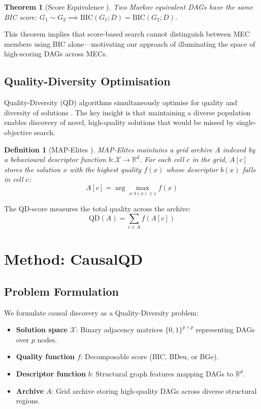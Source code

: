 \documentclass[11pt,a4paper]{article}
\newtheorem{theorem}{Theorem}
\newtheorem{definition}{Definition}
\begin{document}
\begin{theorem}[Score Equivalence {\citep{chickering2002optimal}}]
\label{thm:score-equiv}
Two Markov equivalent DAGs have the same BIC score: $G_1 \sim G_2 \implies \text{BIC}(G_1; D) = \text{BIC}(G_2; D)$.
\end{theorem}

This theorem implies that score-based search cannot distinguish between MEC members using BIC alone---motivating our approach of illuminating the space of high-scoring DAGs across MECs.

\subsection{Quality-Diversity Optimisation}

Quality-Diversity (QD) algorithms simultaneously optimise for quality and diversity of solutions \citep{pugh2016quality}. The key insight is that maintaining a diverse population enables discovery of novel, high-quality solutions that would be missed by single-objective search.

\begin{definition}[MAP-Elites {\citep{mouret2015illuminating}}]
MAP-Elites maintains a grid archive $A$ indexed by a behavioural descriptor function $b: \mathcal{X} \to \mathbb{R}^d$. For each cell $c$ in the grid, $A[c]$ stores the solution $x$ with the highest quality $f(x)$ whose descriptor $b(x)$ falls in cell $c$:
\begin{equation}
    A[c] = \arg\max_{x : b(x) \in c} f(x)
\end{equation}
\end{definition}

The QD-score measures the total quality across the archive:
\begin{equation}
    \text{QD}(A) = \sum_{c \in A} f(A[c])
\end{equation}

\section{Method: CausalQD}
\label{sec:method}

\subsection{Problem Formulation}

We formulate causal discovery as a Quality-Diversity problem:

\begin{itemize}[leftmargin=*]
    \item \textbf{Solution space} $\mathcal{X}$: Binary adjacency matrices $\{0, 1\}^{p \times p}$ representing DAGs over $p$ nodes.
    \item \textbf{Quality function} $f$: Decomposable score (BIC, BDeu, or BGe).
    \item \textbf{Descriptor function} $b$: Structural graph features mapping DAGs to $\mathbb{R}^d$.
    \item \textbf{Archive} $A$: Grid archive storing high-quality DAGs across diverse structural regions.
\end{itemize}
\end{document}
